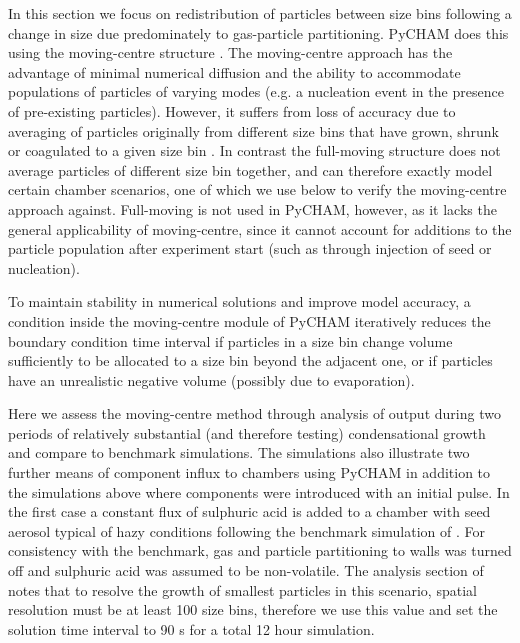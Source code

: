 \documentclass[gmd, manuscript]{copernicus}
\begin{document}
In this section we focus on redistribution of particles between size bins following a change in size due predominately to gas-particle partitioning.  PyCHAM does this using the moving-centre structure \citep{Jacobson2005}.  The moving-centre approach has the advantage of minimal numerical diffusion and the ability to accommodate populations of particles of varying modes (e.g. a nucleation event in the presence of pre-existing particles).  However, it suffers from loss of accuracy due to averaging of particles originally from different size bins that have grown, shrunk or coagulated to a given size bin \citep{Zhang1999}.  In contrast the full-moving structure does not average particles of different size bin together, and can therefore exactly model certain chamber scenarios, one of which we use below to verify the moving-centre approach against.  Full-moving is not used in PyCHAM, however, as it lacks the general applicability of moving-centre, since it cannot account for additions to the particle population after experiment start (such as through injection of seed or nucleation).  

To maintain stability in numerical solutions and improve model accuracy, a condition inside the moving-centre module of PyCHAM iteratively reduces the boundary condition time interval if particles in a size bin change volume sufficiently to be allocated to a size bin beyond the adjacent one, or if particles have an unrealistic negative volume (possibly due to evaporation).

Here we assess the moving-centre method through analysis of output during two periods of relatively substantial (and therefore testing) condensational growth and compare to benchmark simulations.  The simulations also illustrate two further means of component influx to chambers using PyCHAM in addition to the simulations above where components were introduced with an initial pulse.  In the first case a constant flux of sulphuric acid is added to a chamber with seed aerosol typical of hazy conditions following the benchmark simulation of \citet{Zhang1999}.  For consistency with the benchmark, gas and particle partitioning to walls was turned off and sulphuric acid was assumed to be non-volatile.  The analysis section of \citet{Zhang1999} notes that to resolve the growth of smallest particles in this scenario, spatial resolution must be at least 100 size bins, therefore we use this value and set the solution time interval to 90 s for a total 12 hour simulation.  
\end{document}
